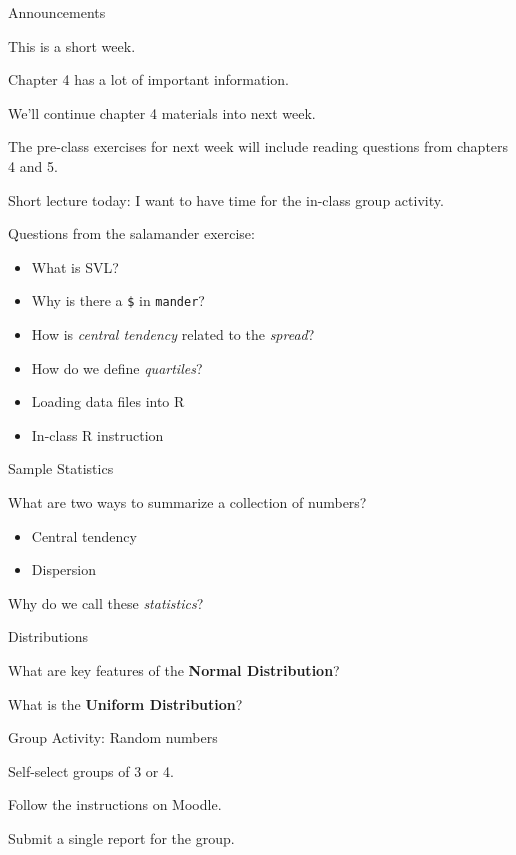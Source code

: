 \documentclass[ignorenonframetext,]{beamer}
\providecommand{\tightlist}{%
  \setlength{\itemsep}{0pt}\setlength{\parskip}{0pt}}
\begin{document}
\begin{frame}{Announcements}

This is a short week.

Chapter 4 has a lot of important information.

We'll continue chapter 4 materials into next week.

The pre-class exercises for next week will include reading questions
from chapters 4 and 5.

Short lecture today: I want to have time for the in-class group
activity.

\end{frame}

\begin{frame}[fragile]{Questions from the salamander exercise:}

\begin{itemize}
\tightlist
\item
  What is SVL?
\item
  Why is there a \texttt{\$} in \texttt{mander}?
\item
  How is \emph{central tendency} related to the \emph{spread}?
\item
  How do we define \emph{quartiles}?
\item
  Loading data files into R
\item
  In-class R instruction
\end{itemize}

\end{frame}

\begin{frame}{Sample Statistics}

What are two ways to summarize a collection of numbers?

\begin{itemize}
\tightlist
\item
  Central tendency
\item
  Dispersion
\end{itemize}

Why do we call these \emph{statistics}?

\end{frame}

\begin{frame}{Distributions}

What are key features of the \textbf{Normal Distribution}?

What is the \textbf{Uniform Distribution}?

\end{frame}

\begin{frame}{Group Activity: Random numbers}

Self-select groups of 3 or 4.

Follow the instructions on Moodle.

Submit a single report for the group.

\end{frame}
\end{document}
